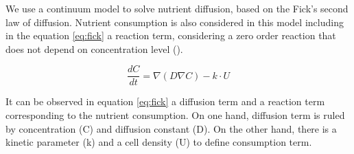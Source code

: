 We use a continuum model to solve nutrient diffusion, based on the Fick's second law of diffusion. Nutrient consumption is also considered in this model including in the equation \ref{eq:fick} a reaction term, considering a zero order reaction that does not depend on concentration level (\cite{Dunn2006}).   

\begin{equation} \label{eq:fick}
\dfrac{dC}{dt}=\nabla (D\nabla C)-k\cdot U
\end{equation}


It can be observed in equation \eqref{eq:fick} a diffusion term and a reaction term corresponding to the nutrient consumption. On one hand, diffusion term is ruled by concentration (C) and diffusion constant (D). On the other hand, there is a kinetic parameter (k) and a cell density (U) to define consumption term.       
